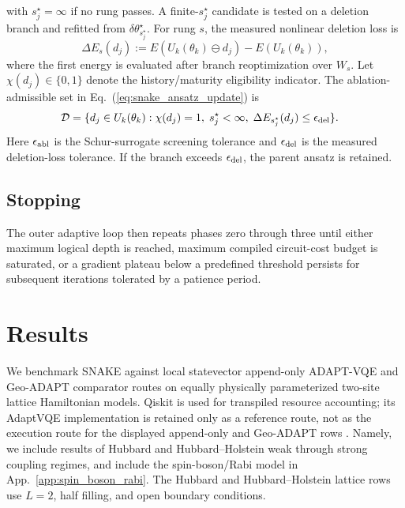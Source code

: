\documentclass[
  reprint,
  amsmath,
  amssymb,
  aps,
  pra,
  nofootinbib,
  superscriptaddress,
  floatfix
]{revtex4-2}
\begin{document}
with \(s_j^\star=\infty\) if no rung passes. A finite-\(s_j^\star\) candidate is tested on a deletion branch and refitted from \(\delta\theta_{s_j^\star}^\star\). For rung \(s\), the measured nonlinear deletion loss is
\begin{equation}
\Delta E_s(d_j)
:=
E(U_k(\theta_k)\ominus d_j)-E(U_k(\theta_k)),
\label{eq:ablation_refit_loss}
\end{equation}
where the first energy is evaluated after branch reoptimization over \(W_s\). Let \(\chi(d_j)\in\{0,1\}\) denote the history/maturity eligibility indicator. The ablation-admissible set in Eq.~(\ref{eq:snake_ansatz_update}) is
\begin{equation}
\begin{aligned}
\mathcal D
=
\{d_j\in U_k(\theta_k):\;&
\chi(d_j)=1,\;
s_j^\star<\infty,\;
\Delta E_{s_j^\star}(d_j)\le\epsilon_{\rm del}\}.
\end{aligned}
\label{eq:ablation_admissible_set}
\end{equation}
Here \(\epsilon_{\rm abl}\) is the Schur-surrogate screening tolerance and \(\epsilon_{\rm del}\) is the measured deletion-loss tolerance. If the branch exceeds \(\epsilon_{\rm del}\), the parent ansatz is retained.

\subsection{Stopping}
The outer adaptive loop then repeats phases zero through three until either maximum logical depth is reached, maximum compiled circuit-cost budget is saturated, or a gradient plateau below a predefined threshold persists for subsequent iterations tolerated by a patience period.


\section{Results}
\label{sec:results}
\label{sec:benchmarks}

We benchmark SNAKE against local statevector append-only ADAPT-VQE and Geo-ADAPT comparator routes on equally physically parameterized two-site lattice Hamiltonian models. Qiskit is used for transpiled resource accounting; its AdaptVQE implementation is retained only as a reference route, not as the execution route for the displayed append-only and Geo-ADAPT rows \cite{JavadiAbhari2024Qiskit,QiskitAlgorithmsAdaptVQE}. Namely, we include results of Hubbard and Hubbard--Holstein weak through strong coupling regimes, and include the spin-boson/Rabi model in App.~\ref{app:spin_boson_rabi}. The Hubbard and Hubbard--Holstein lattice rows use \(L=2\), half filling, and open boundary conditions.
\end{document}
